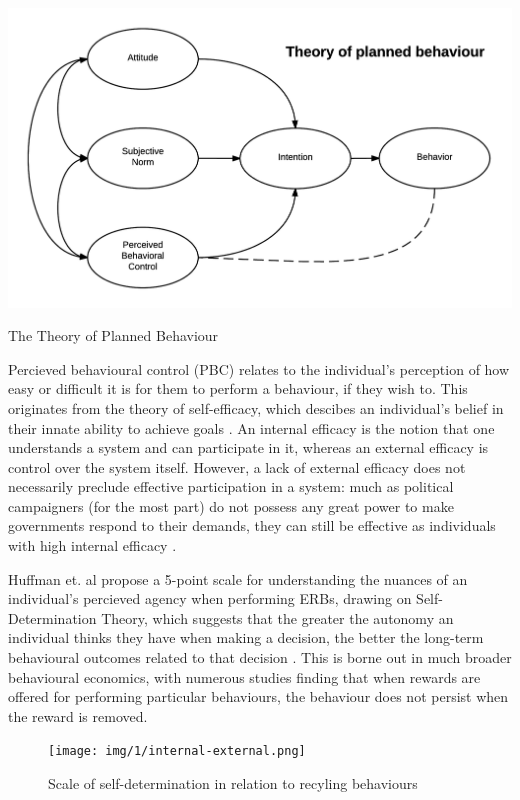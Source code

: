 \documentclass[nofonts,nols,justified,nobib]{tufte-book}
\begin{document}
\begin{marginfigure}
\includegraphics[width=\textwidth]{img/1/tpb.png}
\caption{The Theory of Planned Behaviour \cite{ajzen_theory_1991}}
\end{marginfigure}

Percieved behavioural control (PBC) relates to the individual's perception of how easy or difficult it is for them to perform a behaviour, if they wish to. This originates from the theory of self-efficacy, which descibes an individual's belief in their innate ability to achieve goals \cite{bandura_self-efficacy_1982}. An internal efficacy is the notion that one understands a system and can participate in it, whereas an external efficacy is control over the system itself. However, a lack of external efficacy does not necessarily preclude effective participation in a system: much as political campaigners (for the most part) do not possess any great power to make governments respond to their demands, they can still be effective as individuals with high internal efficacy \cite{zuckerman_mobilizing_2019}.

Huffman et. al propose a 5-point scale for understanding the nuances of an individual's percieved agency when performing ERBs, drawing on Self-Determination Theory, which suggests that the greater the autonomy an individual thinks they have when making a decision, the better the long-term behavioural outcomes related to that decision \cite{huffman_when_2014}. This is borne out in much broader behavioural economics, with numerous studies finding that when rewards are offered for performing particular behaviours, the behaviour does not persist when the reward is removed.

\begin{figure}
\texttt{[image: img/1/internal-external.png]}
\caption{Scale of self-determination in relation to recyling behaviours \cite{huffman_when_2014}}
\end{figure}
\end{document}
